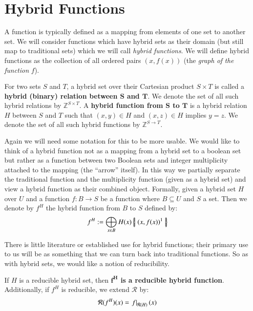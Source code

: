 \section{Hybrid Functions}
\label{sec:HybridFunction}


A function is typically defined as a mapping from elements of one set to another set.
We will consider functions which have hybrid sets as their domain (but still map to traditional sets) 
which we will call \emph{hybrid functions}.
We will define hybrid functions as the collection of all ordered pairs $(x,f(x))$ (the \emph{graph of the function} $f$).


\begin{definition}
	For two sets $S$ and $T$, a hybrid set over their Cartesian product $S \times T$ is called a 
	\textbf{hybrid (binary) relation between $\boldsymbol{S}$ and $\boldsymbol{T}$}.
	We denote the set of all such hybrid relations by $\mathbb{Z}^{S \times T}$. 
	A \textbf{hybrid function from $\boldsymbol{S}$ to $\boldsymbol{T}$} is 
	a hybrid relation $H$ between $S$ and $T$ such that $(x,y) \in H$ and $(x,z) \in H$ implies $y=z$.
	We denote the set of all such hybrid functions by $\mathbb{Z}^{S \to T}$.
\end{definition}


Again we will need some notation for this to be more usable.
We would like to think of a hybrid function not as a mapping from a hybrid set to a boolean set but rather as
a function between two Boolean sets and integer multiplicity attached to the mapping (the ``arrow'' itself).
In this way we partially separate the traditional function and the multiplicity function (given as a hybrid set) and view a
hybrid function as their combined object.
Formally, given a hybrid set $H$ over $U$ and a function $f:B \to S$ be a function where $B \subseteq U$ and $S$ a set.
Then we denote by $f^H$ the hybrid function from $B$ to $S$ defined by:
\begin{equation}
	\label{hfunc}
	f^H := \bigoplus_{x \in B} H(x) \left\{ \! \left| \;  (x, f(x) )^1  \; \right| \! \right\}
\end{equation}


There is little literature or established use for hybrid functions;
their primary use to us will be as something that we can turn back into traditional functions.
So as with hybrid sets, we would like a notion of reducibility.


\begin{definition}
	If $H$ is a reducible hybrid set, then \textbf{$\boldsymbol{f^H}$ is a reducible hybrid function}. 
	Additionally, if $f^H$ is reducible, we extend $\mathcal{R}$ by:
	\begin{equation}
		\mathcal{R}(f^H)(x) = \left.f\right|_{\mathcal{R}(H)}(x)
	\end{equation}
\end{definition}


